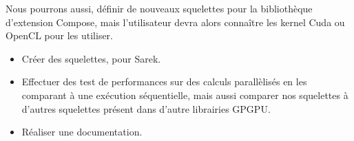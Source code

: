 \documentclass{report}
\begin{document}
Nous pourrons aussi, définir de nouveaux squelettes pour la bibliothèque d’extension Compose, mais l’utilisateur devra alors connaître les kernel Cuda ou OpenCL pour les utiliser. 

\begin{itemize}
\item Créer des squelettes, pour Sarek.
\item Effectuer des test de performances sur des calculs parallèlisés en les comparant à une exécution séquentielle, mais aussi comparer nos squelettes à d’autres squelettes présent dans d’autre librairies GPGPU.
\item Réaliser une documentation.
\end{itemize}

%
%
\end{document}
